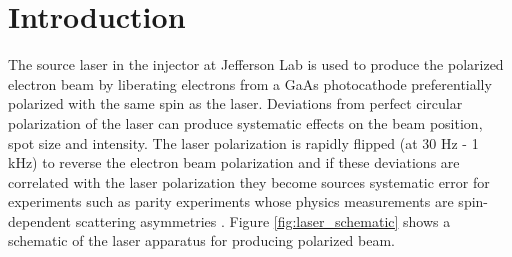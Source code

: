 \documentclass[12pt]{article}
\begin{document}
\section{Introduction}
The source laser in the injector at Jefferson Lab is used to produce the polarized electron beam by liberating electrons from a GaAs photocathode preferentially polarized with the same spin as the laser. Deviations from perfect circular polarization of the laser can produce systematic effects on the beam position, spot size and intensity. The laser polarization is rapidly flipped (at 30 Hz - 1 kHz) to reverse the electron beam polarization and if these deviations are correlated with the laser polarization they become sources systematic error for experiments such as parity experiments whose physics measurements are spin-dependent scattering asymmetries \cite{Paschke2007}.  Figure \ref{fig:laser_schematic} shows a schematic of the laser apparatus for producing polarized beam.
\end{document}
